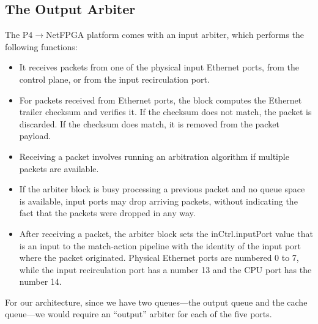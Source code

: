 	\subsection{The Output Arbiter}
The P4$\rightarrow$NetFPGA platform comes with an input arbiter, which performs the following functions:
\begin{itemize}
	\item It receives packets from one of the physical input Ethernet ports, from the control plane, or from the input recirculation port.
	\item For packets received from Ethernet ports, the block computes the Ethernet trailer checksum and verifies it. If the checksum does not match, the packet is discarded. If the checksum does match, it is removed from the packet payload.
	\item Receiving a packet involves running an arbitration algorithm if multiple packets are available.
	\item If the arbiter block is busy processing a previous packet and no queue space is available, input ports may drop arriving packets, without indicating the fact that the packets were dropped in any way.
	\item 	After receiving a packet, the arbiter block sets the inCtrl.inputPort value that is an input to the match-action pipeline with the identity of the input port where the packet originated. Physical Ethernet ports are numbered 0 to 7, while the input recirculation port has a number 13 and the CPU port has the number 14. 
\end{itemize}
For our architecture, since we have two queues---the output queue and the cache queue---we would require an ``output'' arbiter for each of the five ports.

